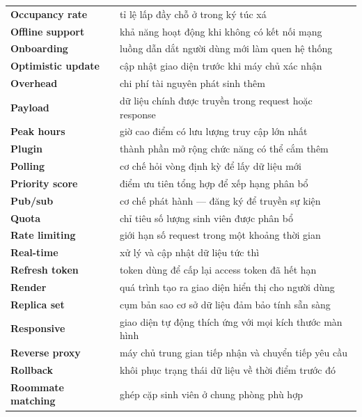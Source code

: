 \documentclass[../DoAn.tex]{subfiles}
\begin{document}
\begin{longtable}{p{4.2cm} p{10.3cm}}
    \textbf{Occupancy rate}       & tỉ lệ lấp đầy chỗ ở trong ký túc xá \\
    \textbf{Offline support}      & khả năng hoạt động khi không có kết nối mạng \\
    \textbf{Onboarding}           & luồng dẫn dắt người dùng mới làm quen hệ thống \\
    \textbf{Optimistic update}    & cập nhật giao diện trước khi máy chủ xác nhận \\
    \textbf{Overhead}             & chi phí tài nguyên phát sinh thêm \\
    \textbf{Payload}              & dữ liệu chính được truyền trong request hoặc response \\
    \textbf{Peak hours}           & giờ cao điểm có lưu lượng truy cập lớn nhất \\
    \textbf{Plugin}               & thành phần mở rộng chức năng có thể cắm thêm \\
    \textbf{Polling}              & cơ chế hỏi vòng định kỳ để lấy dữ liệu mới \\
    \textbf{Priority score}       & điểm ưu tiên tổng hợp để xếp hạng phân bổ \\
    \textbf{Pub/sub}              & cơ chế phát hành --- đăng ký để truyền sự kiện \\
    \textbf{Quota}                & chỉ tiêu số lượng sinh viên được phân bổ \\
    \textbf{Rate limiting}        & giới hạn số request trong một khoảng thời gian \\
    \textbf{Real-time}            & xử lý và cập nhật dữ liệu tức thì \\
    \textbf{Refresh token}        & token dùng để cấp lại access token đã hết hạn \\
    \textbf{Render}               & quá trình tạo ra giao diện hiển thị cho người dùng \\
    \textbf{Replica set}          & cụm bản sao cơ sở dữ liệu đảm bảo tính sẵn sàng \\
    \textbf{Responsive}           & giao diện tự động thích ứng với mọi kích thước màn hình \\
    \textbf{Reverse proxy}        & máy chủ trung gian tiếp nhận và chuyển tiếp yêu cầu \\
    \textbf{Rollback}             & khôi phục trạng thái dữ liệu về thời điểm trước đó \\
    \textbf{Roommate matching}    & ghép cặp sinh viên ở chung phòng phù hợp \\

\end{longtable}
\end{document}
